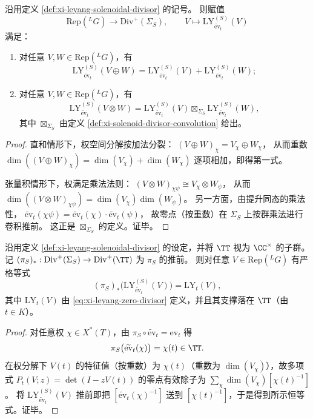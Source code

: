 \begin{theorem}\label{thm:xi-leyang-solenoidal-lift-monoidal}
沿用定义 \ref{def:xi-leyang-solenoidal-divisor} 的记号。
则赋值
\[
\mathrm{Rep}({}^{L}G)\longrightarrow \mathrm{Div}^{+}(\Sigma_S),
\qquad
V\longmapsto \mathrm{LY}^{(S)}_{\widetilde{\mathrm{ev}}_t}(V)
\]
满足：
\begin{enumerate}
  \item 对任意 \(V,W\in \mathrm{Rep}({}^{L}G)\)，有
  \[
  \mathrm{LY}^{(S)}_{\widetilde{\mathrm{ev}}_t}(V\oplus W)
  =\mathrm{LY}^{(S)}_{\widetilde{\mathrm{ev}}_t}(V)+\mathrm{LY}^{(S)}_{\widetilde{\mathrm{ev}}_t}(W);
  \]
  \item 对任意 \(V,W\in \mathrm{Rep}({}^{L}G)\)，有
  \[
  \mathrm{LY}^{(S)}_{\widetilde{\mathrm{ev}}_t}(V\otimes W)
  =\mathrm{LY}^{(S)}_{\widetilde{\mathrm{ev}}_t}(V)\boxtimes_{\Sigma_S}\mathrm{LY}^{(S)}_{\widetilde{\mathrm{ev}}_t}(W),
  \]
  其中 \(\boxtimes_{\Sigma_S}\) 由定义 \ref{def:xi-solenoid-divisor-convolution} 给出。
\end{enumerate}
\end{theorem}
\begin{proof}
直和情形下，权空间分解按加法分裂：
\(
(V\oplus W)_{\chi}=V_{\chi}\oplus W_{\chi}
\)，
从而重数 \(\dim((V\oplus W)_{\chi})=\dim(V_{\chi})+\dim(W_{\chi})\) 逐项相加，即得第一式。
\par
张量积情形下，权满足乘法法则：
\(
(V\otimes W)_{\chi\psi}\cong V_{\chi}\otimes W_{\psi}
\)，
从而
\(
\dim((V\otimes W)_{\chi\psi})=\dim(V_{\chi})\dim(W_{\psi})
\)。
另一方面，由提升同态的乘法性，
\(
\widetilde{\mathrm{ev}}_t(\chi\psi)=\widetilde{\mathrm{ev}}_t(\chi)\cdot \widetilde{\mathrm{ev}}_t(\psi)
\)，
故零点（按重数）在 \(\Sigma_S\) 上按群乘法进行卷积推前。
这正是 \(\boxtimes_{\Sigma_S}\) 的定义。证毕。
\end{proof}

\begin{corollary}[单位圆投影的严格复原]\label{cor:xi-leyang-solenoidal-projection-recovers-circle}
沿用定义 \ref{def:xi-leyang-solenoidal-divisor} 的设定，并将 \(\TT\) 视为 \(\CC^{\times}\) 的子群。
记 \((\pi_S)_{\ast}:\mathrm{Div}^{+}(\Sigma_S)\to \mathrm{Div}^{+}(\TT)\) 为 \(\pi_S\) 的推前。
则对任意 \(V\in\mathrm{Rep}({}^{L}G)\) 有严格等式
\[
(\pi_S)_{\ast}\bigl(\mathrm{LY}^{(S)}_{\widetilde{\mathrm{ev}}_t}(V)\bigr)
=
\mathrm{LY}_t(V),
\]
其中 \(\mathrm{LY}_t(V)\) 由 \eqref{eq:xi-leyang-zero-divisor} 定义，并且其支撑落在 \(\TT\)（由 \(t\in K\)）。
\end{corollary}
\begin{proof}
对任意权 \(\chi\in X^{\ast}(T)\)，由 \(\pi_S\circ \widetilde{\mathrm{ev}}_t=\mathrm{ev}_t\) 得
\[
\pi_S\bigl(\widetilde{\mathrm{ev}}_t(\chi)\bigr)=\chi(t)\in\TT.
\]
在权分解下 \(V(t)\) 的特征值（按重数）为 \(\chi(t)\)（重数为 \(\dim(V_{\chi})\)），故多项式
\(
P_t(V;z)=\det(I-zV(t))
\)
的零点有效除子为
\(
\sum_{\chi}\dim(V_{\chi})[\chi(t)^{-1}]
\)。
将 \(\mathrm{LY}^{(S)}_{\widetilde{\mathrm{ev}}_t}(V)\) 推前即把
\([\widetilde{\mathrm{ev}}_t(\chi)^{-1}]\) 送到 \([\chi(t)^{-1}]\)，于是得到所示恒等式。证毕。
\end{proof}

\endinput
